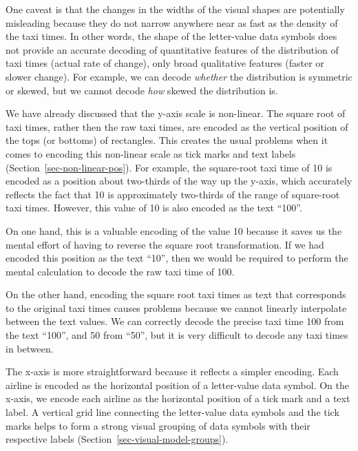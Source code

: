 \documentclass[
  letterpaper,
  DIV=11,
  numbers=noendperiod]{scrreprt}
\providecommand{\tightlist}{%
  \setlength{\itemsep}{0pt}\setlength{\parskip}{0pt}}
\begin{document}
One caveat is that the changes in the widths of the visual shapes are
potentially misleading because they do not narrow anywhere near as fast
as the density of the taxi times. In other words, the shape of the
letter-value data symbols does not provide an accurate decoding of
quantitative features of the distribution of taxi times (actual rate of
change), only broad qualitative features (faster or slower change). For
example, we can decode \emph{whether} the distribution is symmetric or
skewed, but we cannot decode \emph{how} skewed the distribution is.

\begin{description}
\tightlist
\item[Encoding encodings]
We have already discussed that the y-axis scale is non-linear. The
square root of taxi times, rather then the raw taxi times, are encoded
as the vertical position of the tops (or bottoms) of rectangles. This
creates the usual problems when it comes to encoding this non-linear
scale as tick marks and text labels (Section~\ref{sec-non-linear-pos}).
For example, the square-root taxi time of 10 is encoded as a position
about two-thirds of the way up the y-axis, which accurately reflects the
fact that 10 is approximately two-thirds of the range of square-root
taxi times. However, this value of 10 is also encoded as the text
``100''.
\end{description}

On one hand, this is a valuable encoding of the value 10 because it
saves us the mental effort of having to reverse the square root
transformation. If we had encoded this position as the text ``10'', then
we would be required to perform the mental calculation to decode the raw
taxi time of 100.

On the other hand, encoding the square root taxi times as text that
corresponds to the original taxi times causes problems because we cannot
linearly interpolate between the text values. We can correctly decode
the precise taxi time 100 from the text ``100'', and 50 from ``50'', but
it is very difficult to decode any taxi times in between.

The x-axis is more straightforward because it reflects a simpler
encoding. Each airline is encoded as the horizontal position of a
letter-value data symbol. On the x-axis, we encode each airline as the
horizontal position of a tick mark and a text label. A vertical grid
line connecting the letter-value data symbols and the tick marks helps
to form a strong visual grouping of data symbols with their respective
labels (Section~\ref{sec-visual-model-groups}).
\end{document}
